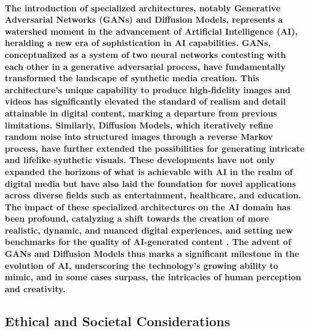 \documentclass[11pt,a4paper,oneside]{report}
\begin{document}
\paragraph{The introduction of specialized architectures, notably Generative Adversarial Networks (GANs) and Diffusion Models, represents a watershed moment in the advancement of Artificial Intelligence (AI), heralding a new era of sophistication in AI capabilities. GANs, conceptualized as a system of two neural networks contesting with each other in a generative adversarial process, have fundamentally transformed the landscape of synthetic media creation. This architecture's unique capability to produce high-fidelity images and videos has significantly elevated the standard of realism and detail attainable in digital content, marking a departure from previous limitations. Similarly, Diffusion Models, which iteratively refine random noise into structured images through a reverse Markov process, have further extended the possibilities for generating intricate and lifelike synthetic visuals. These developments have not only expanded the horizons of what is achievable with AI in the realm of digital media but have also laid the foundation for novel applications across diverse fields such as entertainment, healthcare, and education. The impact of these specialized architectures on the AI domain has been profound, catalyzing a shift towards the creation of more realistic, dynamic, and nuanced digital experiences, and setting new benchmarks for the quality of AI-generated content \cite{granot2022drop}. The advent of GANs and Diffusion Models thus marks a significant milestone in the evolution of AI, underscoring the technology's growing ability to mimic, and in some cases surpass, the intricacies of human perception and creativity.}

\subsection{Ethical and Societal Considerations}
\end{document}
